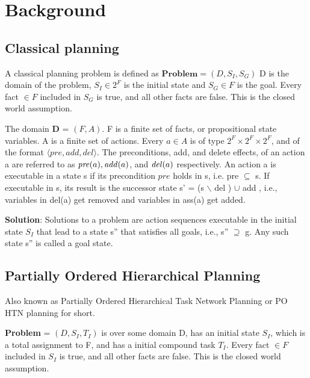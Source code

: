 \chapter{Background}\label{chap:background}

\section{Classical planning}
A classical planning problem is defined as $\textbf{Problem} = (D, S_I, S_G)$ \newline
D is the domain of the problem, 
$S_I \in 2^F$ is the initial state and $S_G \in F$ is the goal. \newline
Every fact $\in F$ included in $S_G$ is true, and all other facts are false. This is the closed world assumption.

The domain \textbf{D} = $(F, A)$. 
F is a finite set of facts, or propositional state variables.
A is a finite set of actions. 
Every $a \in A$ is of type $2^F \times 2^F \times 2^F$, and of the format $\langle pre, add, del \rangle$. 
The preconditions, add, and delete effects, of an action a are referred to as $\mathit{pre}(a), \mathit{add}(a)$, and $\mathit{del}(a)$ respectively.
An action a is executable in a state s if its precondition $pre$ holds in s, i.e. pre $\subseteq$ s. 
If executable in s, its result is the successor state s' = (s $\backslash$ del ) $\cup$ add , i.e., variables in del(a) get removed and variables in ass(a) get added.

\textbf{Solution}: Solutions to a problem are action sequences executable in the initial state $S_I$ that lead to a state s'' that satisfies all
goals, i.e., s'' $ \supseteq$ g. Any such state s'' is called a goal state.

\newpage
\section{Partially Ordered Hierarchical Planning}
Also known as Partially Ordered Hierarchical Task Network Planning or PO HTN planning for short.


\textbf{Problem} = $(D, S_I, T_I)$
is over some domain D, 
has an initial state $S_I$, which is a total assignment to F, and 
has a initial compound task $T_I$. 
Every fact $\in F$ included in $S_I$ is true, and all other facts are false. This is the closed world assumption.

